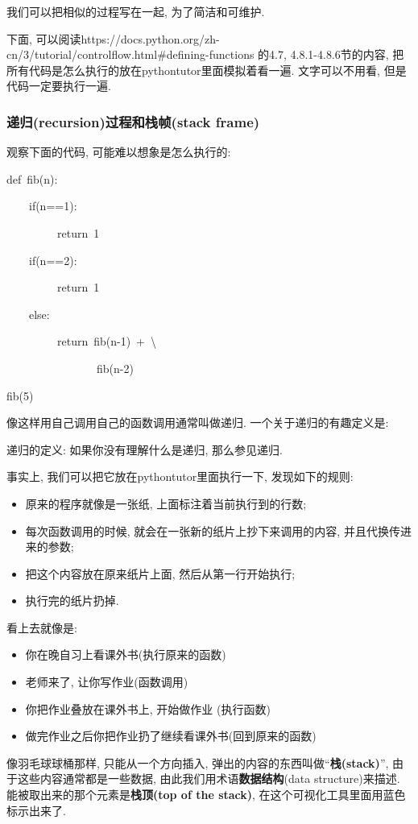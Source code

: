 我们可以把相似的过程写在一起, 为了简洁和可维护.

下面, 可以阅读https://docs.python.org/zh-cn/3/tutorial/controlflow.html\#defining-functions
的4.7, 4.8.1-4.8.6节的内容, 把所有代码是怎么执行的放在pythontutor里面模拟着看一遍. 文字可以不用看,
但是代码一定要执行一遍. 

\subsubsection{递归(recursion)过程和栈帧(stack frame)}

观察下面的代码, 可能难以想象是怎么执行的:
\begin{lyxcode}
def~fib(n):

~~~~if(n==1):

~~~~~~~~~return~1

~~~~if(n==2):

~~~~~~~~~return~1

~~~~else:

~~~~~~~~~return~fib(n-1)~+~\textbackslash{}

~~~~~~~~~~~~~~~~fib(n-2)

fib(5)
\end{lyxcode}
像这样用自己调用自己的函数调用通常叫做递归. 一个关于递归的有趣定义是:
\begin{definition}
递归的定义: 如果你没有理解什么是递归, 那么参见递归. 
\end{definition}
事实上, 我们可以把它放在pythontutor里面执行一下, 发现如下的规则:
\begin{itemize}
\item 原来的程序就像是一张纸, 上面标注着当前执行到的行数;
\item 每次函数调用的时候, 就会在一张新的纸片上抄下来调用的内容, 并且代换传进来的参数;
\item 把这个内容放在原来纸片上面, 然后从第一行开始执行;
\item 执行完的纸片扔掉.
\end{itemize}
看上去就像是:
\begin{itemize}
\item 你在晚自习上看课外书(执行原来的函数) 
\item 老师来了, 让你写作业(函数调用) 
\item 你把作业叠放在课外书上, 开始做作业 (执行函数)
\item 做完作业之后你把作业扔了继续看课外书(回到原来的函数)
\end{itemize}
像羽毛球球桶那样, 只能从一个方向插入, 弹出的内容的东西叫做``\textbf{栈(stack)}'', 由于这些内容通常都是一些数据,
由此我们用术语\textbf{数据结构}(data structure)来描述. 能被取出来的那个元素是\textbf{栈顶(top
of the stack)}, 在这个可视化工具里面用蓝色标示出来了. 

